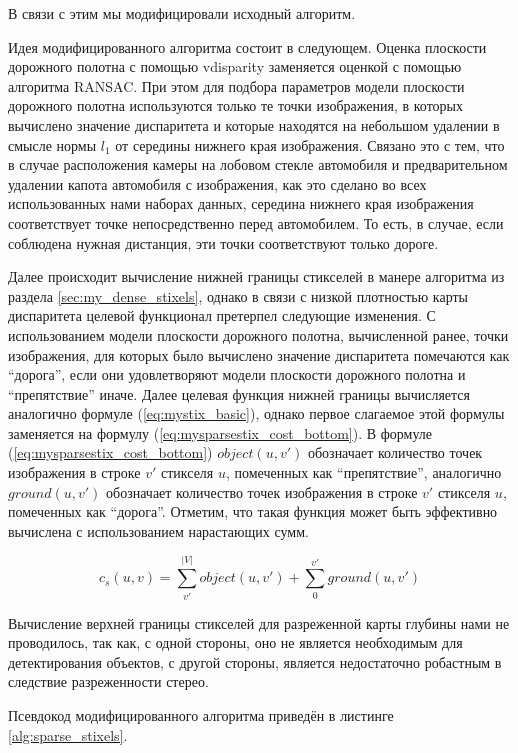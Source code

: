 \documentclass[aps,%
14pt,%
final,%
oneside,
onecolumn,%
musixtex, %
superscriptaddress,%
centertags]{extarticle} %
\begin{document}
В связи с этим мы модифицировали исходный алгоритм. 

Идея модифицированного алгоритма состоит в следующем. Оценка плоскости дорожного полотна с помощью vdisparity заменяется оценкой с помощью алгоритма RANSAC. При этом для подбора параметров модели плоскости дорожного полотна используются только те точки изображения, в которых вычислено значение диспаритета и которые находятся на небольшом удалении в смысле нормы $l_1$ от середины нижнего края изображения. Связано это с тем, что в случае расположения камеры на лобовом стекле автомобиля и предварительном удалении капота автомобиля с изображения, как это сделано во всех использованных нами наборах данных, середина нижнего края изображения соответствует точке непосредственно перед автомобилем. То есть, в случае, если соблюдена нужная дистанция, эти точки соответствуют только дороге.

Далее происходит вычисление нижней границы стикселей в манере алгоритма из раздела \ref{sec:my_dense_stixels}, однако в связи с низкой плотностью карты диспаритета целевой функционал претерпел следующие изменения. С использованием модели плоскости дорожного полотна, вычисленной ранее, точки изображения, для которых было вычислено значение диспаритета помечаются как ``дорога'', если они удовлетворяют модели плоскости дорожного полотна и ``препятствие'' иначе. Далее целевая функция нижней границы вычисляется аналогично формуле (\ref{eq:mystix_basic}), однако первое слагаемое этой формулы заменяется на формулу (\ref{eq:mysparsestix_cost_bottom}). В формуле (\ref{eq:mysparsestix_cost_bottom}) $object(u, v')$ обозначает количество точек изображения в строке $v'$ стикселя $u$, помеченных как ``препятствие'', аналогично $ground(u, v')$ обозначает количество точек изображения в строке $v'$ стикселя $u$, помеченных как ``дорога''. Отметим, что такая функция может быть эффективно вычислена с использованием нарастающих сумм.

\begin{equation}\label{eq:mysparsestix_cost_bottom}
c_s(u, v) = \sum_{v'}^{|V|} object(u, v') + \sum_{0}^{v'} ground(u, v')
\end{equation}

Вычисление верхней границы стикселей для разреженной карты глубины нами не проводилось, так как, с одной стороны, оно не является необходимым для детектирования объектов, с другой стороны, является недостаточно робастным в следствие разреженности стерео.

Псевдокод модифицированного алгоритма приведён в листинге \ref{alg:sparse_stixels}.
\end{document}
